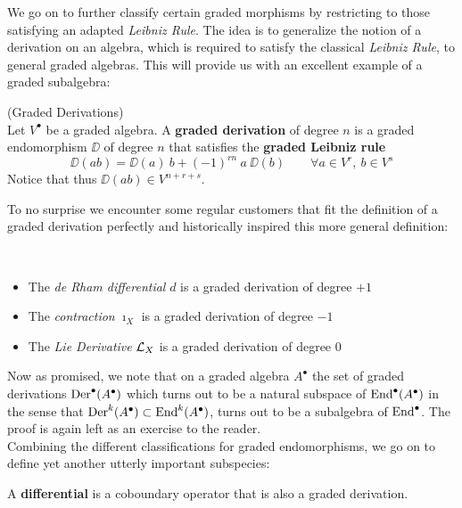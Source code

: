 We go on to further classify certain graded morphisms by restricting to those satisfying an adapted \emph{Leibniz Rule}. The idea is to generalize the notion of a derivation on an algebra, which is required to satisfy the classical \emph{Leibniz Rule}, to general graded algebras. This will provide us with an excellent example of a graded subalgebra:

\begin{definition} (Graded Derivations)\\
  Let $V^\bullet$ be a graded algebra. A \textbf{graded derivation} of degree $n$ is a graded endomorphism $\DD$ of degree $n$ that satisfies the \textbf{graded Leibniz rule}
  $$ \DD (ab) = \DD(a) \ b + (-1)^{rn} \ a \ \DD(b) \quad \quad \forall a \in V^r, \ b \in V^s $$
  Notice that thus $\DD(ab) \in V^{n+r+s}$.
\end{definition}

To no surprise we encounter some regular customers that fit the definition of a graded derivation perfectly and historically inspired this more general definition:

\begin{example}~
  \begin{itemize}
    \item The \emph{de Rham differential} $d$ is a graded derivation of degree $+1$
    \item The \emph{contraction} $\imath_X$ is a graded derivation of degree $-1$
    \item The \emph{Lie Derivative} $\mathcal{L}_{X}$ is a graded derivation of degree $0$
  \end{itemize}
\end{example}

Now as promised, we note that on a graded algebra $A^\bullet$ the set of graded derivations $\operatorname{Der}^\bullet(A^\bullet)$ which turns out to be a natural subspace of $\operatorname{End}^\bullet(A^\bullet)$ in the sense that $\operatorname{Der}^k(A^\bullet) \subset \operatorname{End}^k(A^\bullet)$, turns out to be a subalgebra of $\operatorname{End}^\bullet$. The proof is again left as an exercise to the reader.\\

Combining the different classifications for graded endomorphisms, we go on to define yet another utterly important subspecies:

\begin{definition}
  A \textbf{differential} is a coboundary operator that is also a graded derivation.
\end{definition}

